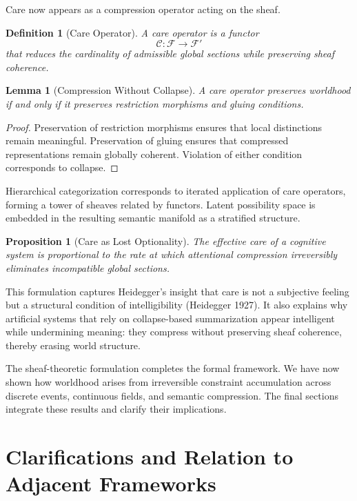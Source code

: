 \documentclass[11pt]{article}
\newtheorem{definition}{Definition}
\newtheorem{lemma}{Lemma}
\newtheorem{proposition}{Proposition}
\theoremstyle{remark}
\begin{document}
Care now appears as a compression operator acting on the sheaf.

\begin{definition}[Care Operator]
A care operator is a functor
\[
\mathcal{C} : \mathcal{F} \rightarrow \mathcal{F}'
\]
that reduces the cardinality of admissible global sections while preserving sheaf coherence.
\end{definition}

\begin{lemma}[Compression Without Collapse]
A care operator preserves worldhood if and only if it preserves restriction morphisms and gluing conditions.
\end{lemma}

\begin{proof}
Preservation of restriction morphisms ensures that local distinctions remain meaningful. Preservation of gluing ensures that compressed representations remain globally coherent. Violation of either condition corresponds to collapse.
\end{proof}

Hierarchical categorization corresponds to iterated application of care operators, forming a tower of sheaves related by functors. Latent possibility space is embedded in the resulting semantic manifold as a stratified structure.

\begin{proposition}[Care as Lost Optionality]
The effective care of a cognitive system is proportional to the rate at which attentional compression irreversibly eliminates incompatible global sections.
\end{proposition}

This formulation captures Heidegger’s insight that care is not a subjective feeling but a structural condition of intelligibility (Heidegger 1927). It also explains why artificial systems that rely on collapse-based summarization appear intelligent while undermining meaning: they compress without preserving sheaf coherence, thereby erasing world structure.

The sheaf-theoretic formulation completes the formal framework. We have now shown how worldhood arises from irreversible constraint accumulation across discrete events, continuous fields, and semantic compression. The final sections integrate these results and clarify their implications.

\section{Clarifications and Relation to Adjacent Frameworks}
\end{document}
